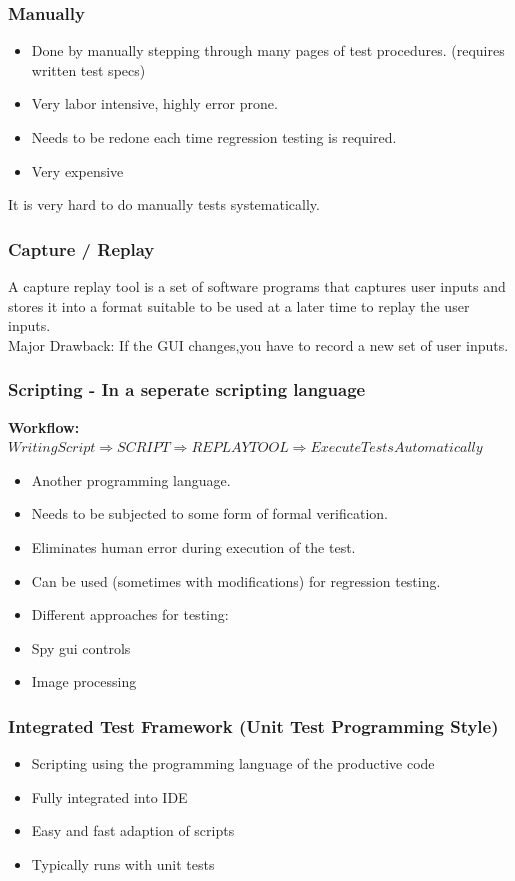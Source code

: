 \documentclass[a4paper,10pt]{article}
\newcommand{\Bold}[1]{\textbf{#1}} %
\begin{document}
\subsubsection{Manually}
\begin{itemize}
\item Done by manually stepping through many pages of test procedures.
(requires written test specs)
\item Very labor intensive, highly error prone.
\item Needs to be redone each time regression testing is required.
\item Very expensive
\end{itemize}
It is very hard to do manually tests systematically.

\subsubsection{Capture / Replay}
A capture replay tool is a set of software programs that captures user inputs and stores it into a format suitable to be used at a later time to replay the user inputs.\\

Major Drawback: If the GUI changes,you have to record a new set of user inputs.

\subsubsection{Scripting - In a seperate scripting language}
\textbf{\Bold Workflow:} $Writing Script \Longrightarrow SCRIPT \Longrightarrow REPLAY TOOL \Longrightarrow Execute Tests Automatically$

\begin{itemize}
\item Another programming language.
\item Needs to be subjected to some form of formal verification.
\item Eliminates human error during execution of the test.
\item Can be used (sometimes with modifications) for regression testing.
\item Different approaches for testing:
\item Spy gui controls
\item Image processing
\end{itemize}

\subsubsection{Integrated Test Framework (Unit Test Programming Style)}
\begin{itemize}
\item Scripting using the programming language of the productive code
\item Fully integrated into IDE
\item Easy and fast adaption of scripts
\item Typically runs with unit tests
\end{itemize}
\end{document}
